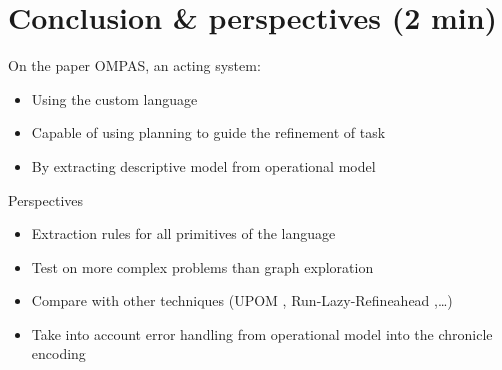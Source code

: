\section{Conclusion \& perspectives (2 min)}
\begin{frame}[c]{On the paper}
    OMPAS, an acting system:
    \pause
        \begin{itemize}
            \item Using the custom language
            \pause
            \item Capable of using planning to guide the refinement of task
            \pause
            \item By extracting descriptive model from operational model
        \end{itemize}    
\end{frame}

\begin{frame}[c]{Perspectives}
    \begin{itemize}
        \item Extraction rules for all primitives of the language
        \pause
        \item Test on more complex problems than graph exploration
        \pause
        \item Compare with other techniques (UPOM \cite{patraIntegratingActingPlanning2020}, Run-Lazy-Refineahead \cite{bansod2021integrating},\dots)
        \pause
        \item Take into account error handling from operational model into the chronicle encoding
    \end{itemize}
\end{frame}